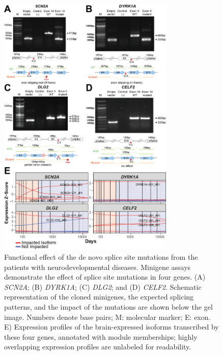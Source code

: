 \documentclass[12pt,chapterheads,final]{ucsd}
\begin{document}
\begin{figure}[h]
  \centering
  \includegraphics[width=0.75\textwidth]{figure4}
  \caption[Gene and isoform co-expression modules reflect distinct signals in neurodevelopment.]
{Functional effect of the de novo splice site mutations from the patients with neurodevelopmental diseases. Minigene assays demonstrate the effect of splice site mutations in four genes. (A) \textit{SCN2A}; (B) \textit{DYRK1A}; (C) \textit{DLG2}; and (D) \textit{CELF2}. Schematic representation of the cloned minigenes, the expected splicing patterns, and the impact of the mutations are shown below the gel image. Numbers denote base pairs; M: molecular marker; E: exon. E) Expression profiles of the brain-expressed isoforms transcribed by these four genes, annotated with module memberships; highly overlapping expression profiles are unlabeled for readability.}
\end{figure}
\end{document}
